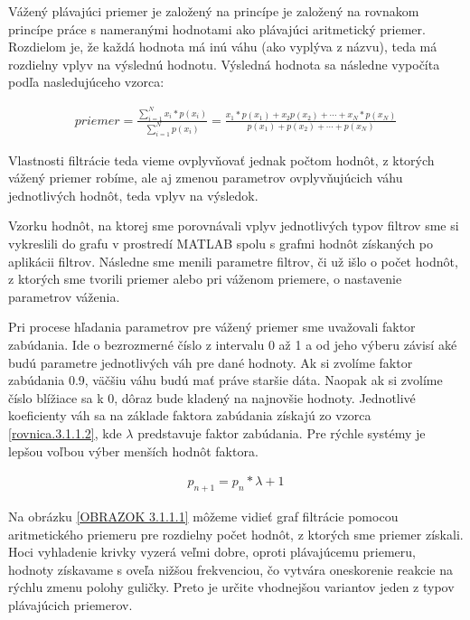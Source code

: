 Vážený plávajúci priemer je založený na princípe je založený na rovnakom princípe práce s nameranými hodnotami ako plávajúci aritmetický priemer. Rozdielom je, že každá hodnota má inú váhu (ako vyplýva z názvu), teda má rozdielny vplyv na výslednú hodnotu.  Výsledná hodnota sa následne vypočíta podľa nasledujúceho vzorca:



\begin{align}
	\label{rovnica.3.1.1.1}
	priemer =\frac{\sum_{i=1}^{N}x_i*p(x_i)}{\sum_{i=1}^{N}p(x_i)} = \frac{ x_1*p(x_1)+x_2p(x_2)+\cdots +x_N*p(x_N)}{ p(x_1)+p(x_2)+\cdots +p(x_N)}
\end{align}

Vlastnosti filtrácie teda vieme ovplyvňovať jednak počtom hodnôt, z ktorých vážený priemer robíme, ale aj zmenou parametrov ovplyvňujúcich váhu jednotlivých hodnôt, teda vplyv na výsledok.

Vzorku hodnôt, na ktorej sme porovnávali vplyv jednotlivých typov filtrov sme si vykreslili do grafu v prostredí MATLAB spolu s grafmi hodnôt získaných po aplikácii filtrov. Následne sme menili parametre filtrov, či už išlo o počet hodnôt, z ktorých sme tvorili priemer alebo pri váženom priemere, o nastavenie parametrov váženia.

Pri procese hľadania parametrov pre vážený priemer sme uvažovali faktor zabúdania. Ide o bezrozmerné číslo z intervalu 0 až 1 a od jeho výberu závisí aké budú parametre jednotlivých váh pre dané hodnoty. Ak si zvolíme faktor zabúdania 0.9, väčšiu váhu budú mať práve staršie dáta. Naopak ak si zvolíme číslo blížiace sa k 0, dôraz bude kladený na najnovšie hodnoty. Jednotlivé koeficienty váh sa na základe faktora zabúdania získajú zo vzorca  \ref{rovnica.3.1.1.2}, kde $\lambda$ predstavuje faktor zabúdania. Pre rýchle systémy je lepšou voľbou výber menších hodnôt faktora.

\begin{align}
	\label{rovnica.3.1.1.2}
	p_{n+1} = p_n*\lambda+1
\end{align}


Na obrázku \ref{OBRAZOK 3.1.1.1} môžeme vidieť graf filtrácie pomocou aritmetického priemeru pre rozdielny počet hodnôt, z ktorých sme priemer získali.  Hoci vyhladenie krivky vyzerá veľmi dobre, oproti plávajúcemu priemeru, hodnoty získavame s oveľa nižšou frekvenciou, čo vytvára oneskorenie reakcie na rýchlu zmenu polohy guličky. Preto je určite vhodnejšou variantov jeden z typov plávajúcich priemerov.

